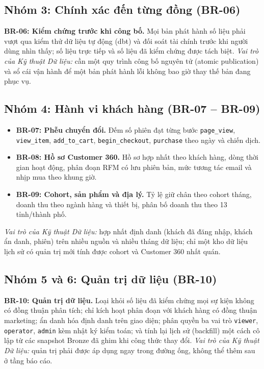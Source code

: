 \subsection{Nhóm 3: Chính xác đến từng đồng (BR-06)}
\label{sec:c1-br-group3}
\textbf{BR-06: Kiểm chứng trước khi công bố.} Mọi bản phát hành số liệu phải vượt qua kiểm thử dữ liệu tự động (dbt) và đối soát tài chính trước khi người dùng nhìn thấy; số liệu trực tiếp và số liệu đã kiểm chứng được tách biệt. \emph{Vai trò của Kỹ thuật Dữ liệu:} cần một quy trình công bố nguyên tử (atomic publication) và sổ cái vận hành để một bản phát hành lỗi không bao giờ thay thế bản đang phục vụ.

\subsection{Nhóm 4: Hành vi khách hàng (BR-07 -- BR-09)}
\label{sec:c1-br-group4}
\begin{itemize}
    \item \textbf{BR-07: Phễu chuyển đổi.} Đếm số phiên đạt từng bước \texttt{page\_view}, \texttt{view\_item}, \texttt{add\_to\_cart}, \texttt{begin\_checkout}, \texttt{purchase} theo ngày và chiến dịch.
    \item \textbf{BR-08: Hồ sơ Customer 360.} Hồ sơ hợp nhất theo khách hàng, dòng thời gian hoạt động, phân đoạn RFM có lưu phiên bản, mức tương tác email và nhịp mua theo khung giờ.
    \item \textbf{BR-09: Cohort, sản phẩm và địa lý.} Tỷ lệ giữ chân theo cohort tháng, doanh thu theo ngành hàng và thiết bị, phân bố doanh thu theo 13 tỉnh/thành phố.
\end{itemize}
\emph{Vai trò của Kỹ thuật Dữ liệu:} hợp nhất định danh (khách đã đăng nhập, khách ẩn danh, phiên) trên nhiều nguồn và nhiều tháng dữ liệu; chỉ một kho dữ liệu lịch sử có quản trị mới tính được cohort và Customer 360 nhất quán.

\subsection{Nhóm 5 và 6: Quản trị dữ liệu (BR-10)}
\label{sec:c1-br-group5-6}
\textbf{BR-10: Quản trị dữ liệu.} Loại khỏi số liệu đã kiểm chứng mọi sự kiện không có đồng thuận phân tích; chỉ kích hoạt phân đoạn với khách hàng có đồng thuận marketing; ẩn danh hóa định danh trên giao diện; phân quyền ba vai trò \texttt{viewer}, \texttt{operator}, \texttt{admin} kèm nhật ký kiểm toán; và tính lại lịch sử (backfill) một cách cô lập từ các snapshot Bronze đã ghim khi công thức thay đổi. \emph{Vai trò của Kỹ thuật Dữ liệu:} quản trị phải được áp dụng ngay trong đường ống, không thể thêm sau ở tầng báo cáo.

